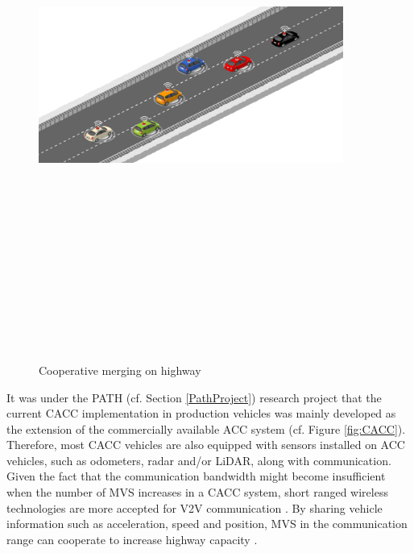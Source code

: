 \begin{figure}[!h]
        \centering 
        \includegraphics[width=10cm,height=18cm,keepaspectratio]{chapters/Chapitre_2/Figures/merging.PNG}
        \caption{Cooperative merging on highway}
        \label{fig:Merging}
        \end{figure}

It was under the PATH (cf. Section \ref{PathProject}) research project that the current CACC implementation in production vehicles was mainly developed as the extension of the commercially available ACC system \cite{6588305} (cf. Figure \ref{fig:CACC}). Therefore, most CACC vehicles are also equipped with sensors installed on ACC vehicles, such as odometers, radar and/or LiDAR, along with communication. Given the fact that the communication bandwidth might become insufficient when the number of MVS increases in a CACC system, short ranged wireless technologies are more accepted for V2V communication \cite{Grilli}. By sharing vehicle information such as acceleration, speed and position, MVS in the communication range can cooperate to increase highway capacity \cite{ren2008distributed}.




